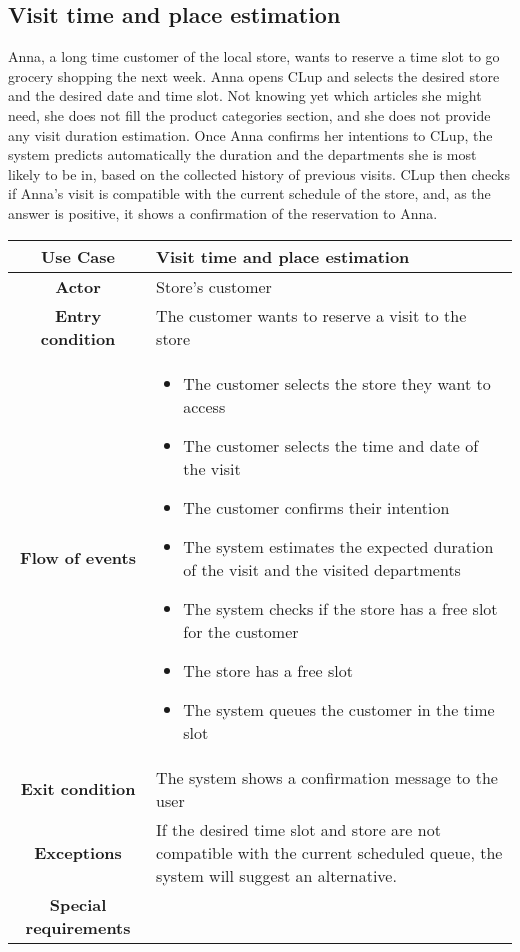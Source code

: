 \documentclass[../../main.tex]{subfiles}
\begin{document}
    \subsection{Visit time and place estimation}

    Anna, a long time customer of the local store, wants to reserve a time slot to go grocery shopping the next week. 
    Anna opens CLup and selects the desired store and the desired date and time slot. 
    Not knowing yet which articles she might need, she does not fill the product categories section, 
    and she does not provide any visit duration estimation. Once Anna confirms her intentions to CLup, 
    the system predicts automatically the duration and the departments she is most likely to be in, 
    based on the collected history of previous visits. CLup then checks if Anna's visit is compatible with the 
    current schedule of the store, and, as the answer is positive, it shows a confirmation of the reservation to Anna.

    \begin{table}[H]
      \centering
        \begin{tabular}{c m{}}
        \hline
        \textbf{Use Case} & Visit time and place estimation\\ \hline
        \textbf{Actor} & Store's customer\\ \hline
        \textbf{Entry condition} & The customer wants to reserve a visit to the store\\  \hline
        \textbf{Flow of events} & \begin{itemize}
                                    \item The customer selects the store they want to access
                                    \item The customer selects the time and date of the visit
                                    \item The customer confirms their intention
                                    \item The system estimates the expected duration of the visit and the visited departments
                                    \item The system checks if the store has a free slot for the customer
                                    \item The store has a free slot
                                    \item The system queues the customer in the time slot
                                  \end{itemize}\\ \hline
        \textbf{Exit condition} & The system shows a confirmation message to the user \\ \hline
        \textbf{Exceptions} & If the desired time slot and store are not compatible with the current scheduled queue, the system will suggest an alternative. \\ \hline
        \textbf{Special requirements} &\\ \hline
        \end{tabular}
    \end{table}
\end{document}
